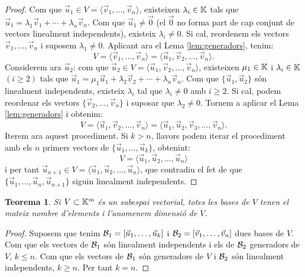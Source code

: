 \documentclass[
  11pt,
]{book}
\numberwithin{dummy}{section}
\theoremstyle{maincolornumbox}
\newtheorem{theorem}{TTTT}[chapter]
\newtheorem{theoremeT}{Teorema}[chapter]
\theoremstyle{blacknumex}
\theoremstyle{blacknumbox}
\theoremstyle{maincolornum}
\renewenvironment{theorem}{\begin{tBox}\begin{theoremeT}}{\end{theoremeT}\end{tBox}}
\newlength\esp
\begin{document}
\begin{proof}
Com que
\(\vec u_1\in V=\langle \vec v_1,\dots,\vec v_n \rangle\), existeixen
\(\lambda_i\in\mathbb{K}\) tals que
\(\vec u_1=\lambda_1 \vec v_1+\cdots+\lambda_n\vec v_n\). Com que
\(\vec u_1 \neq\vec 0\) (el \(\vec 0\) no forma part de cap conjunt de
vectors linealment independents), existeix \(\lambda_i\neq 0\). Si cal,
reordenem els vectors \(\vec v_1,\dots,\vec v_n\) i suposem
\(\lambda_1\neq 0\). Aplicant ara el Lema
\ref{lem:generadors}, tenim:
\[V=\langle \vec v_1,\dots,\vec v_n \rangle=\langle \vec u_1,\vec v_2,\dots,\vec v_n \rangle .\]
Considerem ara \(\vec u_2\): com que
\(\vec u_2\in V=\langle \vec u_1,\vec v_2,\dots,\vec v_n \rangle\),
existeixen \(\mu_1\in\mathbb{K}\) i \(\lambda_i\in\mathbb{K}\) \((i\geq 2)\) tals que
\(\vec u_1=\mu_1\vec u_1+\lambda_2\vec v_2+\cdots+\lambda_n\vec v_n\). Com
que \(\{\vec u_1,\vec u_2\}\) són linealment independents, existeix
\(\lambda_i\) tal que \(\lambda_i\neq 0\) amb \(i\geq 2\). Si cal, podem
reordenar els vectors \(\{\vec v_2,\dots,\vec v_n\}\) i suposar que
\(\lambda_2\neq 0\). Tornem a aplicar el Lema
\ref{lem:generadors} i obtenim:
\[V=\langle \vec u_1,\vec v_2,\dots,\vec v_{n} \rangle=\langle \vec u_1,\vec u_2,\vec v_3,\dots,\vec v_{n} \rangle .\]
Iterem ara aquest procediment. Si \(k>n\), llavors podem iterar el
procediment amb els \(n\) primers vectors de
\(\{\vec u_1,\dots,\vec u_k\}\), obtenint:
\[V=\langle \vec u_1,\vec u_2,\dots,\vec u_{n} \rangle\] i per tant
\(\vec u_{n+1} \in V=\langle \vec u_1,\vec u_2,\dots,\vec u_{n} \rangle\),
que contradiu el fet de que \(\{\vec u_1, \dots, \vec u_n,\vec u_{n+1}\}\)
siguin linealment independents.
\end{proof}

\begin{theorem}
\protect\hypertarget{thm:bases-igual-cardinalitat}{}\label{thm:bases-igual-cardinalitat}Si \(V\subset \mathbb{K}^m\) és un subespai vectorial, totes les bases de \(V\)
tenen el mateix nombre d'elements i l'anomenem \emph{dimensió de \(V\)}.
\end{theorem}

\begin{proof}
Suposem que tenim \(\mathcal{B}_1=[\vec u_1,\dots,\vec u_k]\) i
\(\mathcal{B}_2=[\vec v_1,\dots,\vec v_n]\) dues bases de \(V\). Com que els
vectors de \(\mathcal{B}_1\) són linealment independents i els de \(\mathcal{B}_2\)
generadors de \(V\), \(k\leq n\). Com que els vectors de \(\mathcal{B}_1\) són
generadors de \(V\) i \(\mathcal{B}_2\) són linealment independents, \(k\geq n\).
Per tant \(k=n\).
\end{proof}
\end{document}
